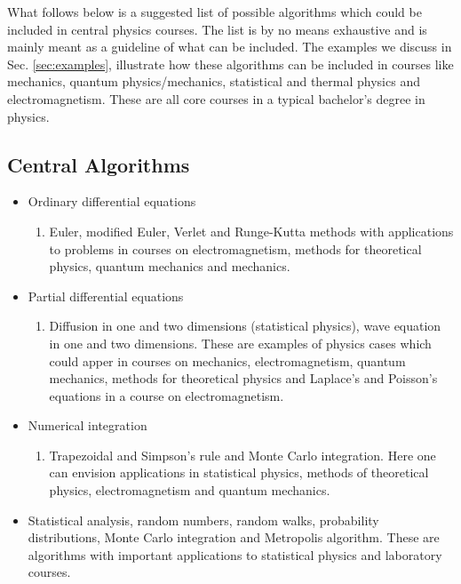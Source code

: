 \documentclass[graybox,envcountchap,sectrefs]{svmult}
\begin{document}
What follows below is a suggested list of possible algorithms which could be included in central physics courses. The list is by no means exhaustive and is mainly meant as a
guideline of what can be included. The examples we discuss in Sec. \ref{sec:examples}, illustrate how these algorithms can be included in courses like mechanics, quantum physics/mechanics, statistical and thermal physics and electromagnetism. These are all core courses in  a typical bachelor's degree in physics.

\subsection{Central Algorithms}
\begin{itemize}
\item Ordinary differential equations
\begin{enumerate}

  \item Euler, modified Euler, Verlet and Runge-Kutta methods with applications to problems in courses on electromagnetism, methods for theoretical physics, quantum mechanics and mechanics.

\end{enumerate}


\item Partial differential equations
\begin{enumerate}

  \item Diffusion in one and two dimensions (statistical physics), wave equation in one and two dimensions. These are examples of physics cases which could apper in courses on  mechanics, electromagnetism, quantum mechanics, methods for theoretical physics and Laplace's and Poisson's equations in  a course on electromagnetism.

\end{enumerate}


\item Numerical integration
\begin{enumerate}

  \item Trapezoidal and Simpson's rule and Monte Carlo integration. Here one can envision applications in statistical physics, methods of theoretical physics, electromagnetism and quantum mechanics.

\end{enumerate}


\item Statistical analysis, random numbers, random walks, probability distributions, Monte Carlo integration and Metropolis algorithm. These are algorithms with important applications to statistical physics and laboratory courses.


\end{itemize}
\end{document}
